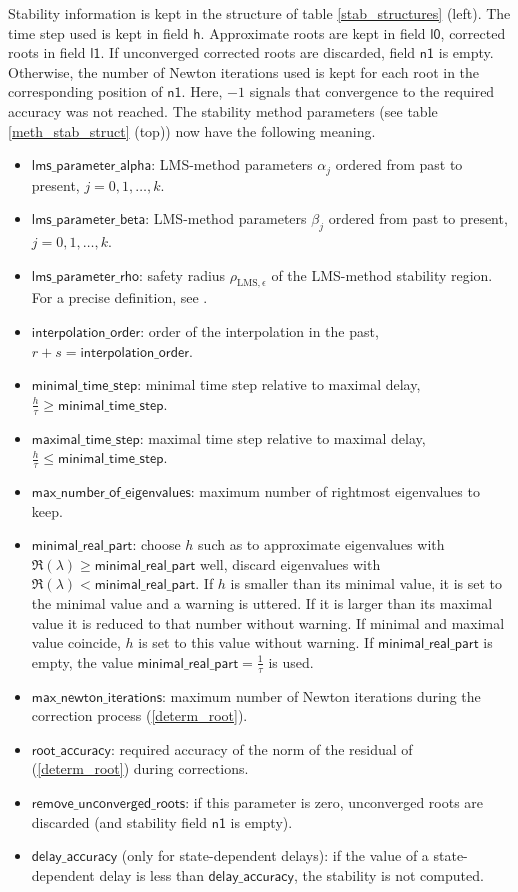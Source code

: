 \documentclass[10pt]{article}
\gdef \parm#1{{\mathsf{#1}}}
\begin{document}
{Stability information is kept in the structure of table \ref{stab_structures} 
(left). The time step used is kept in field $\parm{h}$. Approximate
roots are kept in field $\parm{l0}$, corrected roots in field $\parm{l1}$.
If unconverged corrected roots are discarded, field $\parm{n1}$
is empty.
Otherwise, the number of Newton iterations used is kept for 
each root in the corresponding position of $\parm{n1}$. Here, $-1$ 
signals that 
convergence to the required accuracy
was not reached.
The stability method parameters (see table \ref{meth_stab_struct} (top)) 
now have the following meaning. 
\begin{itemize}
\item $\parm{lms\_parameter\_alpha}$: LMS-method parameters $\alpha_j$ 
ordered from past to present, $j=0,1,\ldots,k$.
\item $\parm{lms\_parameter\_beta}$: LMS-method parameters $\beta_j$ 
ordered from past to present, $j=0,1,\ldots,k$.
\item $\parm{lms\_parameter\_rho}$: safety radius
$\rho_{\mathrm{LMS},\epsilon}$ of the LMS-method stability region.
For a precise definition, see \cite[\S III.3.2]{Enge00}.
\item $\parm{interpolation\_order}$: order of the interpolation in the
past, $r+s=\parm{interpolation\_order}$.
\item $\parm{minimal\_time\_step}$: minimal time step relative to maximal
delay, $\frac{h}{\tau}\geq\parm{minimal\_time\_step}$.
\item $\parm{maximal\_time\_step}$: maximal time step relative to maximal
delay, $\frac{h}{\tau}\leq\parm{minimal\_time\_step}$. 
\item $\parm{max\_number\_of\_eigenvalues}$: maximum number of rightmost
eigenvalues to keep.
\item $\parm{minimal\_real\_part}$: choose $h$ such as to approximate
eigenvalues with $\Re(\lambda)\geq \parm{minimal\_real\_part}$ well,
discard eigenvalues with 
$\Re(\lambda)<\parm{minimal\_real\_part}$.
If $h$ is smaller than its minimal value, it is set to the minimal
value and a warning is uttered. If it is larger than its maximal value
it is reduced to that number without warning.
If minimal and maximal value coincide, $h$ is set to this value
without warning.  
If $\parm{minimal\_real\_part}$ is empty, the value 
$\parm{minimal\_real\_part}=\frac{1}{\tau}$ is used.
\item $\parm{max\_newton\_iterations}$: maximum number of Newton
iterations during the correction process (\ref{determ_root}).
\item $\parm{root\_accuracy}$: required accuracy of 
the norm of the residual of (\ref{determ_root}) during
corrections.
\item $\parm{remove\_unconverged\_roots}$: if this parameter is zero,
unconverged roots are discarded (and stability field $\parm{n1}$ is empty). 
\item $\parm{delay\_accuracy}$ (only for state-dependent delays): if
the value of a state-dependent delay is less than
$\parm{delay\_accuracy}$, the stability is not computed.
\end{itemize}

}
\end{document}
